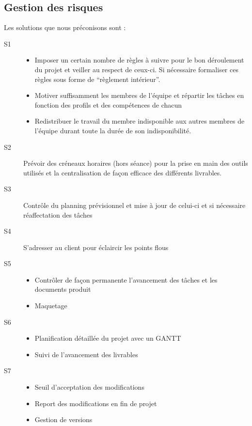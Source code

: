 \subsection{Gestion des risques}

Les solutions que nous préconisons sont :
\begin{description}
    \item[S1]{
        \begin{itemize}
            \item Imposer un certain nombre de règles à suivre pour le bon déroulement du projet et veiller au respect de ceux-ci. Si nécessaire formaliser ces règles sous forme de “règlement intérieur”.
            \item Motiver suffisamment les membres de l’équipe  et répartir les tâches en fonction des profils et des compétences de chacun
            \item Redistribuer le travail du membre indisponible aux autres membres de l’équipe durant toute la durée de son indisponibilité.
        \end{itemize}}
    \item[S2]{
        Prévoir des créneaux horaires (hors séance) pour la prise en main des outils utilisés  et la centralisation de façon efficace des différents livrables.}

    \item[S3]{
        Contrôle du planning prévisionnel et mise à jour de celui-ci et si nécessaire réaffectation des tâches}
    \item[S4]{
        S’adresser au client pour éclaircir les points flous}
    \item[S5]{
        \begin{itemize}
            \item Contrôler de façon permanente l’avancement des tâches et les documents produit
            \item Maquetage
        \end{itemize}}
    \item[S6]{
        \begin{itemize}
            \item Planification détaillée du projet avec un GANTT
            \item Suivi de l’avancement des livrables
        \end{itemize}}
    \item[S7]{
        \begin{itemize}
            \item Seuil d’acceptation des modifications
            \item Report des modifications en fin de projet
            \item Gestion de versions
        \end{itemize}}
\end{description}
